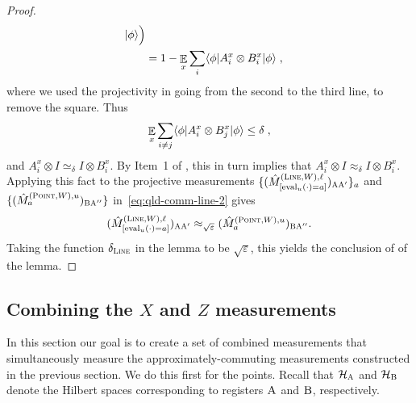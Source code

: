 \documentclass[11pt]{article}
\theoremstyle{definition}
\newcommand{\ket}[1]{|#1\rangle}
\newcommand{\bra}[1]{\langle#1|}
\newcommand{\ot}{\otimes}
\newcommand{\mH}{\ensuremath{\mathcal{H}}}
\newcommand{\eps}{\varepsilon}
\newcommand{\E}{\mathop{\mathbb{E}}\displaylimits}
\newcommand{\labelstyle}[1]{\ensuremath{\textsc{#1}}\xspace}
\newcommand{\alice}{\labelstyle{A}}
\newcommand{\bob}{\labelstyle{B}}
\newcommand{\typestyle}[1]{\ensuremath{\textsc{#1}}\xspace}
\renewcommand{\line}{\mathbf{\ell}}
\newcommand{\Point}{\typestyle{Point}}
\newcommand{\Line}{\typestyle{Line}}
\newcommand{\eval}{\mathrm{eval}}
\begin{document}
\begin{proof}
\begin{align*}
                 \ket{\phi} \Big) \\
               &= 1 - \E_{x} \sum_i \bra{\phi} A^x_i \ot B^x_i \ket{\phi}\;,
\end{align*}
      where we used the projectivity in going from the second to
      the third line, to remove the square. Thus
      \[ \E_{x} \sum_{i \neq j} \bra{\phi} A^x_i \ot B^x_j \ket{\phi} \leq
        \delta\;, \]
      and $A^x_i \ot I \simeq_{\delta} I \ot B^x_i$. By
      Item~1 of , this in turn implies that $A^x_i \ot I
      \approx_\delta I \ot B^x_i$. Applying this fact to the projective
      measurements $\{ (\hat{M}^{(\Line, W), \line}_{[\eval_u(\cdot) =
        a]})_{\alice \alice'} \}_a$ and $\{(\hat{M}^{(\Point,W),
        u}_{a})_{\bob \alice''}\}$ in~\eqref{eq:qld-comm-line-2} gives
      \[
	(\hat{M}^{(\Line,W),\line}_{[\eval_u(\cdot) = a]})_{\alice \alice'} \approx_{\sqrt{\eps}} (\hat{M}^{(\Point,W),u}_{a})_{\bob \alice''}.
      \]
      Taking the function $\delta_{\Line}$ in the lemma to be $\sqrt{\eps}$,
      this yields the conclusion of 
      of the lemma.
\end{proof}

 \subsection{Combining the $X$ and $Z$ measurements}
\label{sec:combining}

In this section our goal is to create a set of combined measurements
that simultaneously measure the approximately-commuting measurements
constructed in the previous section. We do this first for the points.
Recall that $\mH_\alice$ and $\mH_\bob$ denote the Hilbert spaces corresponding to
registers $\alice$ and $\bob$, respectively.
\end{document}
